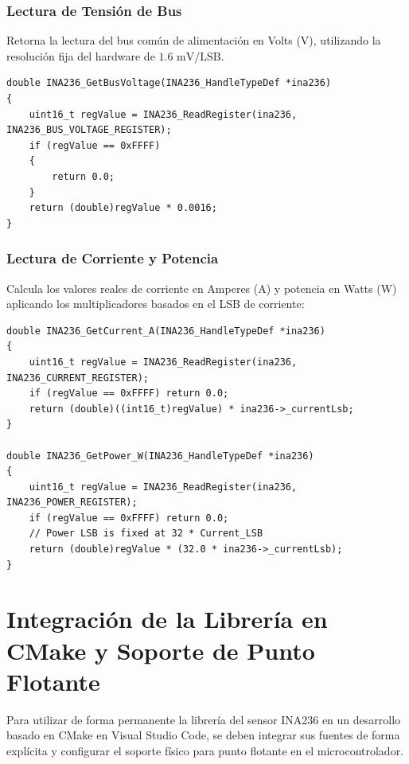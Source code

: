 \documentclass[
10pt, %
a4paper, %
oneside, %
headinclude,footinclude, %
BCOR5mm, %
]{scrartcl}
\begin{document}
\subsubsection{Lectura de Tensión de Bus}
Retorna la lectura del bus común de alimentación en Volts (V), utilizando la resolución fija del hardware de $1.6\text{ mV/LSB}$.
\begin{lstlisting}[style=CMakeStyle]
double INA236_GetBusVoltage(INA236_HandleTypeDef *ina236)
{   
    uint16_t regValue = INA236_ReadRegister(ina236, INA236_BUS_VOLTAGE_REGISTER);
    if (regValue == 0xFFFF)
    {
        return 0.0;
    }
    return (double)regValue * 0.0016;
}
\end{lstlisting}

\subsubsection{Lectura de Corriente y Potencia}
Calcula los valores reales de corriente en Amperes (A) y potencia en Watts (W) aplicando los multiplicadores basados en el LSB de corriente:
\begin{lstlisting}[style=CMakeStyle]
double INA236_GetCurrent_A(INA236_HandleTypeDef *ina236)
{
    uint16_t regValue = INA236_ReadRegister(ina236, INA236_CURRENT_REGISTER);
    if (regValue == 0xFFFF) return 0.0;
    return (double)((int16_t)regValue) * ina236->_currentLsb;
}

double INA236_GetPower_W(INA236_HandleTypeDef *ina236)
{
    uint16_t regValue = INA236_ReadRegister(ina236, INA236_POWER_REGISTER);
    if (regValue == 0xFFFF) return 0.0;
    // Power LSB is fixed at 32 * Current_LSB
    return (double)regValue * (32.0 * ina236->_currentLsb);
}
\end{lstlisting}

\newpage
\section{Integración de la Librería en CMake y Soporte de Punto Flotante}

Para utilizar de forma permanente la librería del sensor INA236 en un desarrollo basado en CMake en Visual Studio Code, se deben integrar sus fuentes de forma explícita y configurar el soporte físico para punto flotante en el microcontrolador.
\end{document}
